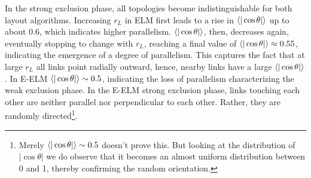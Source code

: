 \documentclass[nofootinbib,preprint,floatfix,endfloats]{revtex4} %
\begin{document}
In the strong exclusion phase, all topologies become indistinguishable for both layout algorithms. Increasing $r_L$ in ELM first leads to a rise in $\be{|\cos\theta|} $ up to about $0.6$, which indicates higher parallelism. 
$\be{|\cos\theta|}$, then, decreases again, eventually stopping to change with $r_L$, reaching a final value of $\be{|\cos\theta|} \approx 0.55 $, indicating the emergence of a degree of parallelism. This captures the fact that at large $r_L$ all links point radially outward, hence, nearby links have a large  $\be{|\cos\theta|}$.
In E-ELM $\be{|\cos\theta|} \sim 0.5 $, indicating the loss of parallelism characterizing the weak exclusion phase. 
In the E-ELM strong exclusion phase, links touching each other are neither parallel nor perpendicular to each other.
Rather, they are randomly directed\footnote{Merely  $\be{|\cos\theta|} \sim 0.5 $ doesn't prove this. But looking at the distribution of $|\cos\theta|$ we do observe that it becomes an almost uniform distribution between 0 and 1, thereby confirming the random orientation.}. 
\end{document}
